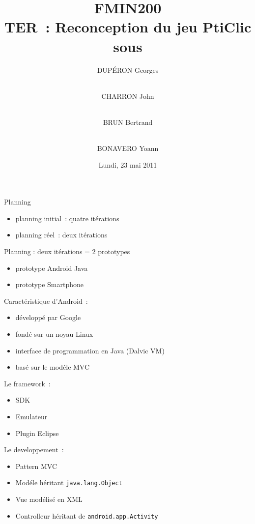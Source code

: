 \documentclass{beamer}
\title{FMIN200 \\ TER~: Reconception du jeu PtiClic sous \android{}}
\author{DUPÉRON Georges \and\\ CHARRON John \and\\ BRUN Bertrand \and\\ BONAVERO Yoann}
\institute{Université Montpellier II, Département informatique}
\date{Lundi, 23 mai 2011}
\def\android{Android\texttrademark}
\begin{document}
\begin{frame}
  \titlepage
\end{frame}

\begin{frame}
  Planning
  \begin{itemize}
  \item planning initial~: quatre itérations
  \item planning réel~: deux itérations
  \end{itemize}
\end{frame}

\begin{frame}
  Planning : deux itérations = 2 prototypes
  \begin{itemize}
  \item prototype Android Java
  \item prototype Smartphone
  \end{itemize}
\end{frame}

\begin{frame}
 Caractéristique d'\android{}~:
  \begin{itemize}
    \item<+-> développé par Google
    \item<+-> fondé sur un noyau Linux
    \item<+-> interface de programmation en Java (Dalvic VM)
    \item<+-> basé sur le modéle MVC
  \end{itemize}
\end{frame}

\begin{frame}
  Le framework~:
  \begin{itemize}
    \item<+-> SDK
    \item<+-> Emulateur
    \item<+-> Plugin Eclipse
  \end{itemize}
\end{frame}

\begin{frame}
  Le developpement~:
  \begin{itemize}
    \item<+-> Pattern MVC
    \item<+-> Modéle héritant \verb!java.lang.Object!
    \item<+-> Vue modélisé en XML
    \item<+-> Controlleur héritant de \verb!android.app.Activity!
  \end{itemize}
\end{frame}
\end{document}
